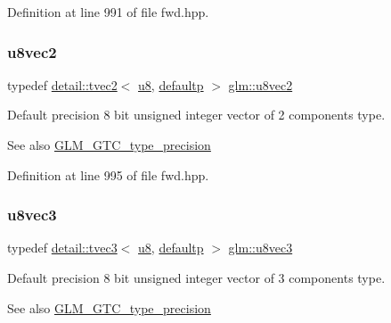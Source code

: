 Definition at line 991 of file fwd.\+hpp.

\mbox{\label{group__gtc__type__precision_gaa7ea171741c23b5bb2a3c91fe8c84e8a}} 
\subsubsection{\texorpdfstring{u8vec2}{u8vec2}}
{\footnotesize\ttfamily typedef \hyperlink{structglm_1_1detail_1_1tvec2}{detail\+::tvec2}$<$ \hyperlink{group__gtc__type__precision_ga5e3dc67373d5068997d2d9f41c9024d2}{u8}, \hyperlink{namespaceglm_a0f04f086094c747d227af4425893f545a9d21ccd8b5a009ec7eb7677befc3bf51}{defaultp} $>$ \hyperlink{group__gtc__type__precision_gaa7ea171741c23b5bb2a3c91fe8c84e8a}{glm\+::u8vec2}}

Default precision 8 bit unsigned integer vector of 2 components type. \begin{DoxySeeAlso}{See also}
\hyperlink{group__gtc__type__precision}{G\+L\+M\+\_\+\+G\+T\+C\+\_\+type\+\_\+precision} 
\end{DoxySeeAlso}


Definition at line 995 of file fwd.\+hpp.

\mbox{\label{group__gtc__type__precision_ga3b4624ecd0485fe5143f956864e7934e}} 
\subsubsection{\texorpdfstring{u8vec3}{u8vec3}}
{\footnotesize\ttfamily typedef \hyperlink{structglm_1_1detail_1_1tvec3}{detail\+::tvec3}$<$ \hyperlink{group__gtc__type__precision_ga5e3dc67373d5068997d2d9f41c9024d2}{u8}, \hyperlink{namespaceglm_a0f04f086094c747d227af4425893f545a9d21ccd8b5a009ec7eb7677befc3bf51}{defaultp} $>$ \hyperlink{group__gtc__type__precision_ga3b4624ecd0485fe5143f956864e7934e}{glm\+::u8vec3}}

Default precision 8 bit unsigned integer vector of 3 components type. \begin{DoxySeeAlso}{See also}
\hyperlink{group__gtc__type__precision}{G\+L\+M\+\_\+\+G\+T\+C\+\_\+type\+\_\+precision} 
\end{DoxySeeAlso}


